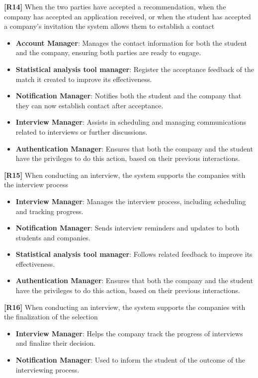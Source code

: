 \textbf{[R14]}  When the two parties have accepted a recommendation, when the company has accepted an application received, or when the student has accepted a company's invitation the system allows them to establish a contact
\begin{itemize}
    \item \textbf{Account Manager}: Manages the contact information for both the student and the company, ensuring both parties are ready to engage.
    \item \textbf{Statistical analysis tool manager}: Register the acceptance feedback of the match it created to improve its effectiveness.
    \item \textbf{Notification Manager}: Notifies both the student and the company that they can now establish contact after acceptance.
    \item \textbf{Interview Manager}: Assists in scheduling and managing communications related to interviews or further discussions.
    \item \textbf{Authentication Manager}: Ensures that both the company and the student have the privileges to do this action, based on their previous interactions.
    
\end{itemize}
\textbf{[R15]} When conducting an interview, the system supports the companies with the interview process
\begin{itemize}
    \item \textbf{Interview Manager}: Manages the interview process, including scheduling and tracking progress.
    \item \textbf{Notification Manager}: Sends interview reminders and updates to both students and companies.
    \item \textbf{Statistical analysis tool manager}: Follows related feedback to improve its effectiveness. 
    \item \textbf{Authentication Manager}: Ensures that both the company and the student have the privileges to do this action, based on their previous interactions.
\end{itemize}
\textbf{[R16]} When conducting an interview, the system supports the companies with the finalization of the selection
\begin{itemize}
    \item \textbf{Interview Manager}: Helps the company track the progress of interviews and finalize their decision.
    \item \textbf{Notification Manager}: Used to inform the student of the outcome of the interviewing process.
\end{itemize}
